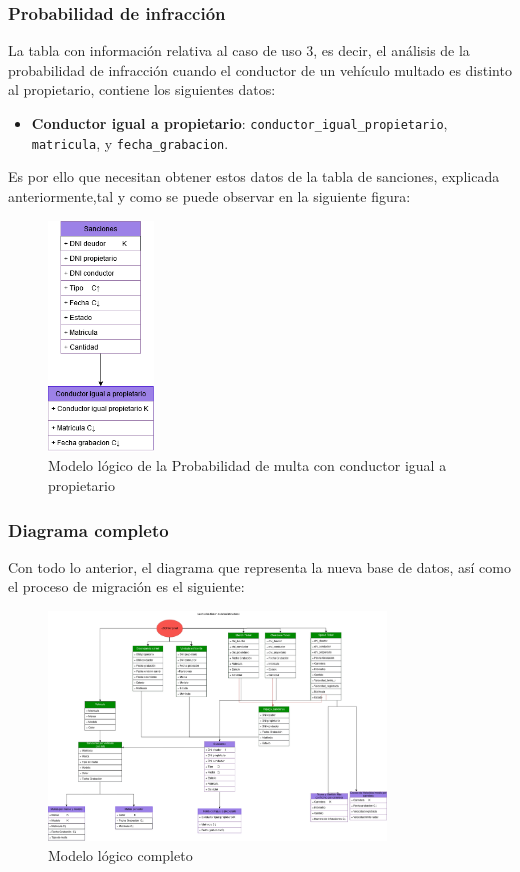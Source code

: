 \documentclass[]{article}
\begin{document}
\subsubsection{Probabilidad de infracción}

La tabla con información relativa al caso de uso 3, es decir, el análisis de la probabilidad de infracción cuando el conductor de un vehículo multado es distinto al propietario, contiene los siguientes datos: 
\begin{itemize}
    \item\textbf{Conductor igual a propietario}: \verb!conductor_igual_propietario!, \verb!matricula!, y \verb!fecha_grabacion!.
\end{itemize}

Es por ello que necesitan obtener estos datos de la tabla de sanciones, explicada anteriormente,tal y como se puede observar en la siguiente figura:

\begin{figure}[H]
    \centering
    \includegraphics[width=0.25\textwidth]{./imagenes/conductores.png}
    \caption{Modelo lógico de la Probabilidad de multa con conductor igual a propietario}
\end{figure}

\subsubsection{Diagrama completo}

Con todo lo anterior, el diagrama que representa la nueva base de datos, así como el proceso de migración es el siguiente:

\begin{figure}[H]
    \centering
    \includegraphics[width=0.8\textwidth]{./imagenes/modelo_migracion.png}
    \caption{Modelo lógico completo}
\end{figure}
\end{document}
